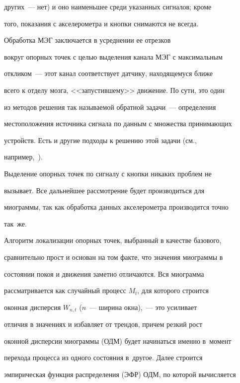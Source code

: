 других~--- нет) и оно наименьшее среди указанных сигналов; кроме


того, показания с акселерометра и кнопки снимаются не всегда.





Обработка МЭГ заключается в усреднении ее отрезков


вокруг опорных точек с целью выделения канала МЭГ с максимальным


откликом~--- этот канал соответствует датчику, находящемуся ближе


всего к отделу мозга, <<запустившему>> движение. По сути, это один


из методов решения так называемой обратной задачи~--- определения


местоположения источника сигнала по данным с множества принимающих


устройств. Есть и другие подходы к решению этой задачи (см.,


например,~\cite{bi_5, bi_6}).





Выделение опорных точек по сигналу с кнопки никаких проблем не


вызывает. Все дальнейшее рассмотрение будет производиться для


миограммы, так как обработка данных акселерометра производится точно


так~же.





Алгоритм локализации опорных точек, выбранный в качестве базового,


сравнительно прост и основан на том факте, что значения миограммы в


состоянии покоя и движения заметно отличаются. Вся миограмма


рассматривается как случайный процесс $M_t$, для которого строится


оконная дисперсия $W_{n,t}$ ($n$~--- ширина окна),~--- это усиливает


отличия в значениях и избавляет от трендов, причем резкий рост


оконной дисперсии миограммы (ОДМ) будет начинаться именно в~момент


перехода процесса из одного состояния в~другое. Далее строится


эмпирическая функция распределения (ЭФР) ОДМ, по которой вычисляется


